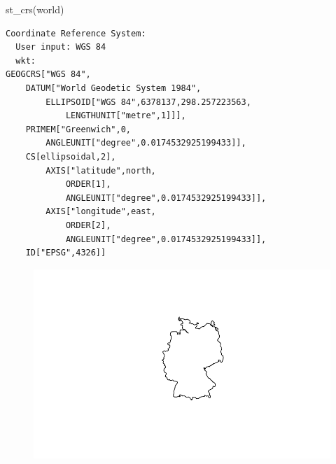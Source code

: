 \documentclass[
  letterpaper,
  DIV=11,
  numbers=noendperiod]{scrreprt}
\newenvironment{Shaded}{\begin{snugshade}}{\end{snugshade}}
\newcommand{\CommentTok}[1]{\textcolor[rgb]{0.37,0.37,0.37}{#1}}
\newcommand{\FunctionTok}[1]{\textcolor[rgb]{0.28,0.35,0.67}{#1}}
\newcommand{\NormalTok}[1]{\textcolor[rgb]{0.00,0.23,0.31}{#1}}
\newcommand{\OtherTok}[1]{\textcolor[rgb]{0.00,0.23,0.31}{#1}}
\newcommand{\SpecialCharTok}[1]{\textcolor[rgb]{0.37,0.37,0.37}{#1}}
\newcommand{\StringTok}[1]{\textcolor[rgb]{0.13,0.47,0.30}{#1}}
\begin{document}
\begin{Shaded}
\begin{Highlighting}[]
\FunctionTok{st\_crs}\NormalTok{(world)}
\end{Highlighting}
\end{Shaded}

\begin{verbatim}
Coordinate Reference System:
  User input: WGS 84 
  wkt:
GEOGCRS["WGS 84",
    DATUM["World Geodetic System 1984",
        ELLIPSOID["WGS 84",6378137,298.257223563,
            LENGTHUNIT["metre",1]]],
    PRIMEM["Greenwich",0,
        ANGLEUNIT["degree",0.0174532925199433]],
    CS[ellipsoidal,2],
        AXIS["latitude",north,
            ORDER[1],
            ANGLEUNIT["degree",0.0174532925199433]],
        AXIS["longitude",east,
            ORDER[2],
            ANGLEUNIT["degree",0.0174532925199433]],
    ID["EPSG",4326]]
\end{verbatim}

\begin{Shaded}
\end{Shaded}

\begin{figure}[H]

{\centering \includegraphics{01_refresher_files/figure-pdf/unnamed-chunk-5-1.pdf}

}

\end{figure}
\end{document}
